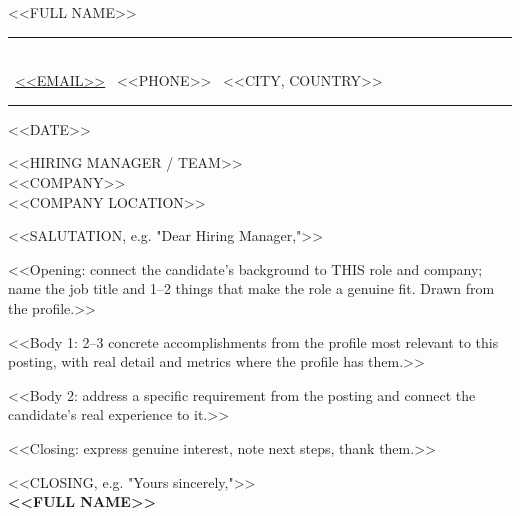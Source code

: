 \documentclass[a4paper,11pt]{article}
\begin{document}
\begin{center}
  {\Huge\color{accentTitle} <<FULL NAME>>}\\[10pt]
  {\color{accentLine}\rule{\linewidth}{0.4pt}}\\[6pt]
  \footnotesize
  \faEnvelope\ \href{mailto:<<EMAIL>>}{<<EMAIL>>} \quad\textbullet\quad
  \faPhone\ <<PHONE>> \quad\textbullet\quad
  \faMapMarker*\ <<CITY, COUNTRY>>\\[6pt]
  {\color{accentLine}\rule{\linewidth}{0.4pt}}
\end{center}

\vspace{6pt}

<<DATE>>
\vspace{2pt}

<<HIRING MANAGER / TEAM>>\\
<<COMPANY>>\\
<<COMPANY LOCATION>>

\vspace{4pt}
<<SALUTATION, e.g. "Dear Hiring Manager,">>

\justifying

<<Opening: connect the candidate's background to THIS role and company; name the job
title and 1–2 things that make the role a genuine fit. Drawn from the profile.>>

<<Body 1: 2–3 concrete accomplishments from the profile most relevant to this posting,
with real detail and metrics where the profile has them.>>

<<Body 2: address a specific requirement from the posting and connect the candidate's
real experience to it.>>

<<Closing: express genuine interest, note next steps, thank them.>>

\vspace{10pt}
<<CLOSING, e.g. "Yours sincerely,">>\\[6pt]
\textbf{<<FULL NAME>>}
\end{document}

